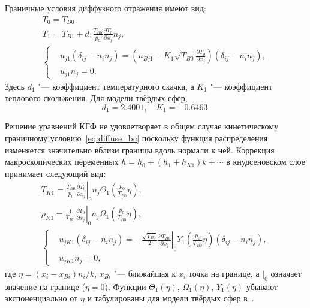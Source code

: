\documentclass[
aps,%
12pt,%
final,%
notitlepage,%
oneside,%
onecolumn,%
nobibnotes,%
nofootinbib,%
superscriptaddress,%
noshowpacs,%
centertags]%
{revtex4}
\newcommand{\pder}[2][]{\frac{\partial#1}{\partial#2}}
\begin{document}
Граничные условия диффузного отражения имеют вид:
\begin{gather}
    T_0 = T_{B0}, \label{eq:bc_T0} \\
    T_1 = T_{B1} + d_1\frac{T_{B0}}{p_0}\pder[T_0]{x_j} n_j, \label{eq:bc_T1} \\
    \left\{
    \begin{aligned}
        & u_{j1} (\delta_{ij}-n_in_j) =
            \left(u_{Bj1} - K_1 \sqrt{T_{B0}} \pder[T_0]{x_j}\right) (\delta_{ij}-n_in_j), \\
        & u_{j1} n_j = 0.
    \end{aligned}
    \right. \label{eq:bc_u1}
\end{gather}
Здесь \(d_1\) "--- коэффициент температурного скачка, а \(K_1\) "--- коэффициент теплового скольжения.
Для модели твёрдых сфер,
\begin{equation}\label{eq:slip_coefficients}
    d_1 = 2.4001, \quad K_1 = -0.6463.
\end{equation}

Решение уравнений КГФ не удовлетворяет в общем случае кинетическому граничному условию~\eqref{eq:diffuse_bc}
поскольку функция распределения изменяется значительно вблизи границы вдоль нормали к ней.
Коррекция макроскопических переменных \(h = h_0 + (h_1 + h_{K1})k + \cdots\) в кнудсеновском слое
принимает следующий вид:
\begin{gather}
    T_{K1} = \frac{T_{B0}}{p_0}\left.\pder[T_0]{x_j}\right|_0 n_j
        \Theta_1\left(\frac{p_0}{T_{B0}}\eta\right), \label{eq:correction_T} \\
    \rho_{K1} = \frac1{T_{B0}}\left.\pder[T_0]{x_j}\right|_0 n_j
        \Omega_1\left(\frac{p_0}{T_{B0}}\eta\right), \label{eq:correction_rho} \\
    \left\{
    \begin{aligned}
        & u_{jK1} (\delta_{ij}-n_in_j) =
            -\frac{\sqrt{T_{B0}}}2 \left.\pder[T_{B0}]{x_j}\right|_0
            Y_1\left(\frac{p_0}{T_{B0}}\eta\right) (\delta_{ij}-n_in_j), \\
        & u_{jK1} n_j = 0,
    \end{aligned}
    \right. \label{eq:correction_u}
\end{gather}
где \(\eta = (x_i-x_{Bi})n_i/k\), \(x_{Bi}\) "--- ближайшая к \(x_i\) точка на границе,
а \(|_0\) означает значение на границе (\(\eta=0\)).
Функции \(\Theta_1(\eta)\), \(\Omega_1(\eta)\), \(Y_1(\eta)\) убывают экспоненциально от \(\eta\)
и табулированы для модели твёрдых сфер в~\cite{Sone2002, Sone2007}.
\end{document}
